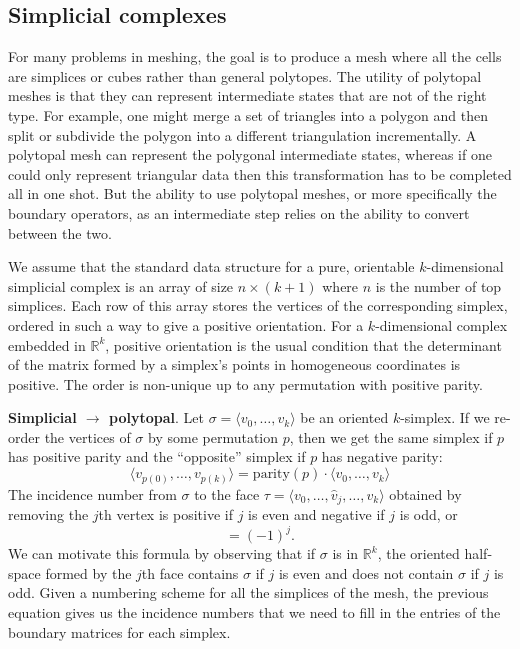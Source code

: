 \documentclass[twocolumn]{article}
\begin{document}
\subsection{Simplicial complexes}

For many problems in meshing, the goal is to produce a mesh where all the cells are simplices or cubes rather than general polytopes.
The utility of polytopal meshes is that they can represent intermediate states that are not of the right type.
For example, one might merge a set of triangles into a polygon and then split or subdivide the polygon into a different triangulation incrementally.
A polytopal mesh can represent the polygonal intermediate states, whereas if one could only represent triangular data then this transformation has to be completed all in one shot.
But the ability to use polytopal meshes, or more specifically the boundary operators, as an intermediate step relies on the ability to convert between the two.

We assume that the standard data structure for a pure, orientable $k$-dimensional simplicial complex is an array of size $n \times (k + 1)$ where $n$ is the number of top simplices.
Each row of this array stores the vertices of the corresponding simplex, ordered in such a way to give a positive orientation.
For a $k$-dimensional complex embedded in $\mathbb{R}^k$, positive orientation is the usual condition that the determinant of the matrix formed by a simplex's points in homogeneous coordinates is positive.
The order is non-unique up to any permutation with positive parity.

\textbf{Simplicial $\rightarrow$ polytopal}.
Let $\sigma = \langle v_0, \ldots, v_k\rangle$ be an oriented $k$-simplex.
If we re-order the vertices of $\sigma$ by some permutation $p$, then we get the same simplex if $p$ has positive parity and the ``opposite'' simplex if $p$ has negative parity:
\begin{equation}
    \langle v_{p(0)},\ldots,v_{p(k)}\rangle = \text{parity}(p)\cdot\langle v_0,\ldots, v_k\rangle
\end{equation}
The incidence number from $\sigma$ to the face $\tau = \langle v_0, \ldots, \hat v_j, \ldots, v_k\rangle$ obtained by removing the $j$th vertex is positive if $j$ is even and negative if $j$ is odd, or
\begin{equation}
    [\sigma, \tau] = (-1)^j.
    \label{eq:simplicial-incidence-numbers}
\end{equation}
We can motivate this formula by observing that if $\sigma$ is in $\mathbb{R}^k$, the oriented half-space formed by the $j$th face contains $\sigma$ if $j$ is even and does not contain $\sigma$ if $j$ is odd.
Given a numbering scheme for all the simplices of the mesh, the previous equation gives us the incidence numbers that we need to fill in the entries of the boundary matrices for each simplex.
\end{document}
